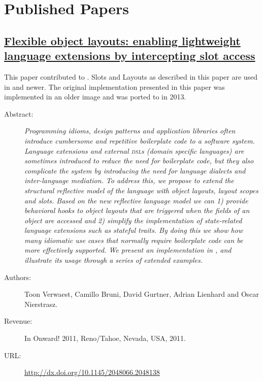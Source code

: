 \section{Published Papers}

\subsection*{\href{http://dx.doi.org/10.1145/2048066.2048138}{Flexible object layouts: enabling lightweight language extensions by intercepting slot access}}

This paper contributed to .
Slots and Layouts as described in this paper are used in  and newer.
The original implementation presented in this paper was implemented in an older  image and was ported to  in 2013.

\begin{description}
	\item[Abstract:] \emph{
Programming idioms, design patterns and application libraries often introduce cumbersome and repetitive boilerplate code to a software system.
Language extensions and external \textsc{dsl}s (domain specific languages) are sometimes introduced to reduce the need for boilerplate code, but they also complicate the system by introducing the need for language dialects and inter-language mediation.
To address this, we propose to extend the structural reflective model of the language with object layouts, layout scopes and slots.
Based on the new reflective language model we can 1) provide behavioral hooks to object layouts that are triggered when the fields of an object are accessed and 2) simplify the implementation of state-related language extensions such as stateful traits.
By doing this we show how many idiomatic use cases that normally require boilerplate code can be more effectively supported.
We present an implementation in \ST, and illustrate its usage through a series of extended examples.}

	\item[Authors:] Toon Verwaest, Camillo Bruni, David Gurtner, Adrian Lienhard and Oscar Nierstrasz. 
	\item[Revenue:] In Onward! 2011, Reno/Tahoe, Nevada, USA, 2011.
	\item[URL:] \url{http://dx.doi.org/10.1145/2048066.2048138}
\end{description}

